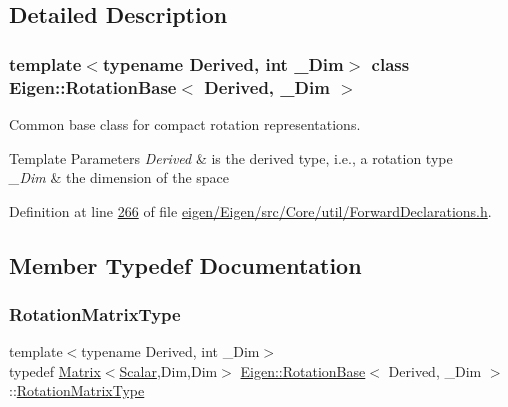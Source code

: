\subsection{Detailed Description}
\subsubsection*{template$<$typename Derived, int \+\_\+\+Dim$>$\newline
class Eigen\+::\+Rotation\+Base$<$ Derived, \+\_\+\+Dim $>$}

Common base class for compact rotation representations. 


\begin{DoxyTemplParams}{Template Parameters}
{\em Derived} & is the derived type, i.\+e., a rotation type \\
\hline
{\em \+\_\+\+Dim} & the dimension of the space \\
\hline
\end{DoxyTemplParams}


Definition at line \hyperlink{eigen_2_eigen_2src_2_core_2util_2_forward_declarations_8h_source_l00266}{266} of file \hyperlink{eigen_2_eigen_2src_2_core_2util_2_forward_declarations_8h_source}{eigen/\+Eigen/src/\+Core/util/\+Forward\+Declarations.\+h}.



\subsection{Member Typedef Documentation}
\mbox{\label{class_eigen_1_1_rotation_base_a83602509674c9d635551998460342951}} 
\subsubsection{\texorpdfstring{Rotation\+Matrix\+Type}{RotationMatrixType}\hspace{0.1cm}{\footnotesize\ttfamily [1/2]}}
{\footnotesize\ttfamily template$<$typename Derived, int \+\_\+\+Dim$>$ \\
typedef \hyperlink{group___core___module_class_eigen_1_1_matrix}{Matrix}$<$\hyperlink{class_eigen_1_1_rotation_base_af9b43eac462d7aa70b018efd49c13ef4}{Scalar},Dim,Dim$>$ \hyperlink{class_eigen_1_1_rotation_base}{Eigen\+::\+Rotation\+Base}$<$ Derived, \+\_\+\+Dim $>$\+::\hyperlink{class_eigen_1_1_rotation_base_a83602509674c9d635551998460342951}{Rotation\+Matrix\+Type}}

